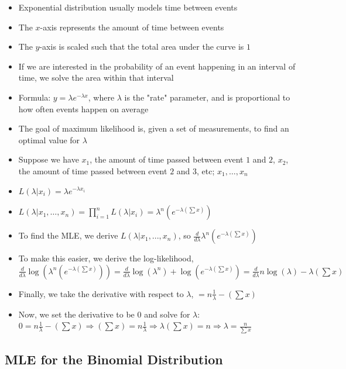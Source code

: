 \documentclass{article}
\begin{document}
\begin{itemize}
    \item Exponential distribution usually models time between events
    \item The $x$-axis represents the amount of time between events
    \item The $y$-axis is scaled such that the total area under the curve is $1$
    \item If we are interested in the probability of an event happening in an interval of time, we solve the area within that interval
    \item Formula: $y=\lambda e^{-\lambda x}$, where $\lambda$ is the "rate" parameter, and is proportional to how often events happen on average
    \item The goal of maximum likelihood is, given a set of measurements, to find an optimal value for $\lambda$
    \item Suppose we have $x_1$, the amount of time passed between event $1$ and $2$, $x_2$, the amount of time passed between event $2$ and $3$, etc; $x_1,\dots,x_n$
    \item $L(\lambda | x_i)=\lambda e^{-\lambda x_i}$
    \item $L(\lambda | x_1,\dots,x_n)=\prod_{i=1}^n L(\lambda | x_i)=\lambda^n(e^{-\lambda(\sum x)})$
    \item To find the MLE, we derive $L(\lambda | x_1,...,x_n)$, so $\frac{d}{d\lambda} \lambda^n (e^{-\lambda(\sum x)})$
    \item To make this easier, we derive the log-likelihood, $\frac{d}{d\lambda} \log(\lambda^n (e^{-\lambda(\sum x)}))=\frac{d}{d\lambda} \log(\lambda^n) + \log(e^{-\lambda(\sum x)})=\frac{d}{d\lambda} n \log(\lambda) - \lambda(\sum x)$
    \item Finally, we take the derivative with respect to $\lambda$, $=n\frac{1}{\lambda}-(\sum x)$
    \item Now, we set the derivative to be 0 and solve for $\lambda$: $0=n\frac{1}{\lambda}-(\sum x) \Rightarrow (\sum x)=n\frac{1}{\lambda} \Rightarrow \lambda(\sum x)=n \Rightarrow \lambda = \frac{n}{\sum x}$
\end{itemize}

\subsection{MLE for the Binomial Distribution}
\end{document}
